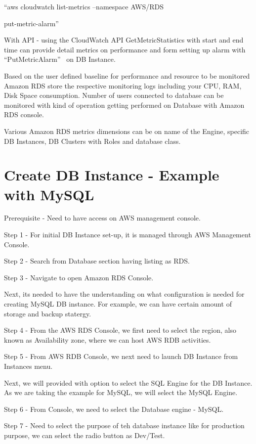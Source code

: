``aws cloudwatch list-metrics --namespace AWS/RDS

put-metric-alarm''~\cite{hid-sp18-520-amardsmon}

With API - using the CloudWatch API GetMetricStatistics with start and end time 
can provide detail metrics on performance and form setting up alarm 
with ``PutMetricAlarm''~\cite{hid-sp18-520-amardsmon} on DB Instance.

Based on the user defined baseline for performance and resource to be monitored 
Amazon RDS store the respective monitoring logs including your CPU, RAM, Disk 
Space consumption.
Number of users connected to database can be monitored with kind of operation 
getting performed on Database with Amazon RDS console.  

Various Amazon RDS metrics dimensions can be on name of the Engine, specific 
DB Instances, DB Clusters with Roles and database class.

\section{Create DB Instance - Example with MySQL}

Prerequisite - Need to have access on AWS management console.

Step 1 - For initial DB Instance set-up, it is managed through AWS Management
Console.

Step 2 - Search from Database section having listing as RDS.

Step 3 - Navigate to open Amazon RDS Console.

Next, its needed to have the understanding on what configuration is needed 
for creating MySQL DB instance. For example, we can have certain amount of 
storage and backup statergy.

Step 4  - From the AWS RDS Console, we first need to select the region, also 
known as Availability zone, where we can host AWS RDB activities.

Step 5 - From AWS RDB Console, we next need to launch DB Instance from 
Instances menu.

Next, we will provided with option to select the SQL Engine for the DB 
Instance. As we are taking the example for MySQL, we will select the 
MySQL Engine.

Step 6 - From Console, we need to select the Database engine - MySQL.

Step 7 - Need to select the purpose of teh database instance like for 
production purpose, we can select the radio button as Dev/Test.

